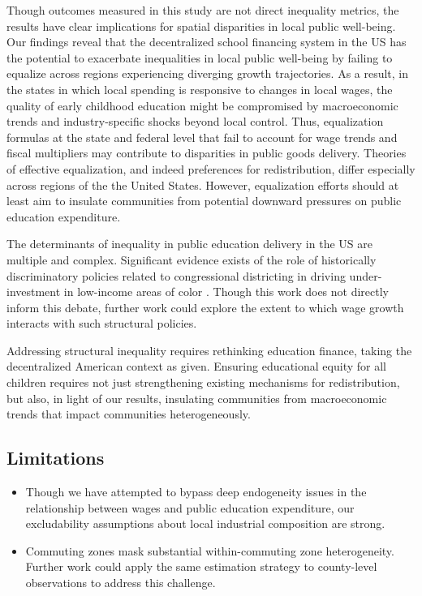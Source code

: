 \documentclass[
  10pt,
]{article}
\begin{document}
Though outcomes measured in this study are not direct inequality
metrics, the results have clear implications for spatial disparities in
local public well-being. Our findings reveal that the decentralized
school financing system in the US has the potential to exacerbate
inequalities in local public well-being by failing to equalize across
regions experiencing diverging growth trajectories. As a result, in the
states in which local spending is responsive to changes in local wages,
the quality of early childhood education might be compromised by
macroeconomic trends and industry-specific shocks beyond local control.
Thus, equalization formulas at the state and federal level that fail to
account for wage trends and fiscal multipliers may contribute to
disparities in public goods delivery. Theories of effective
equalization, and indeed preferences for redistribution, differ
especially across regions of the the United States. However,
equalization efforts should at least aim to insulate communities from
potential downward pressures on public education expenditure.

The determinants of inequality in public education delivery in the US
are multiple and complex. Significant evidence exists of the role of
historically discriminatory policies related to congressional
districting in driving under-investment in low-income areas of color
\autocite{trounstine2016,trounstine2021,sosina2019}. Though this work
does not directly inform this debate, further work could explore the
extent to which wage growth interacts with such structural policies.

Addressing structural inequality requires rethinking education finance,
taking the decentralized American context as given. Ensuring educational
equity for all children requires not just strengthening existing
mechanisms for redistribution, but also, in light of our results,
insulating communities from macroeconomic trends that impact communities
heterogeneously.

\subsection{Limitations}\label{limitations}

\begin{itemize}
\item
  Though we have attempted to bypass deep endogeneity issues in the
  relationship between wages and public education expenditure, our
  excludability assumptions about local industrial composition are
  strong.
\item
  Commuting zones mask substantial within-commuting zone heterogeneity.
  Further work could apply the same estimation strategy to county-level
  observations to address this challenge.
\end{itemize}
\end{document}
